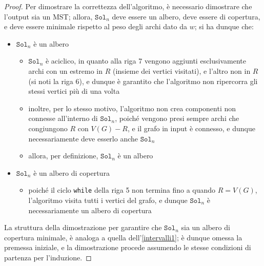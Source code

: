 \documentclass[a4paper, 12pt]{report}
\begin{document}
    \begin{proof}
        Per dimostrare la correttezza dell'algoritmo, è necessario dimostrare che l'output sia un MST; allora, $\texttt{Sol}_n$ deve essere un albero, deve essere di copertura, e deve essere minimale rispetto al peso degli archi dato da $w$; si ha dunque che:

        \begin{itemize}
            \item $\texttt{Sol}_n$ è un albero
                \begin{itemize}
                    \item $\texttt{Sol}_n$ è aciclico, in quanto alla riga 7 vengono aggiunti esclusivamente archi con un estremo in $R$ (insieme dei vertici visitati), e l'altro non in $R$ (si noti la riga 6), e dunque è garantito che l'algoritmo non ripercorra gli stessi vertici più di una volta
                    \item inoltre, per lo stesso motivo, l'algoritmo non crea componenti non connesse all'interno di $\texttt{Sol}_n$, poiché vengono presi sempre archi che congiungono $R$ con $V(G) - R$, e il grafo in input è connesso, e dunque necessariamente deve esserlo anche $\texttt{Sol}_n$
                    \item allora, per definizione, $\texttt{Sol}_n$ è un albero
                \end{itemize}
            \item $\texttt{Sol}_n$ è un albero di copertura
                \begin{itemize}
                    \item poiché il ciclo \texttt{while} della riga 5 non termina fino a quando $R = V(G)$, l'algoritmo visita tutti i vertici del grafo, e dunque $\texttt{Sol}_n$ è necessariamente un albero di copertura
                \end{itemize}
        \end{itemize}

        La struttura della dimostrazione per garantire che $\texttt{Sol}_n$ sia un albero di copertura minimale, è analoga a quella dell'\cref{intervalli1}; è dunque omessa la premessa iniziale, e la dimostrazione procede assumendo le stesse condizioni di partenza per l'induzione.


\end{proof}
\end{document}
